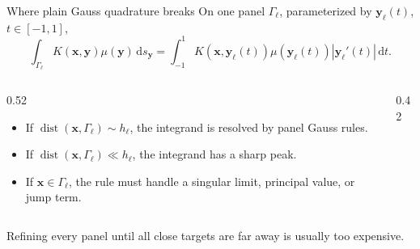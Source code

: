 \documentclass[aspectratio=169,11pt]{beamer}
\newcommand{\dd}{\,\mathrm d}
\newcommand{\x}{\bm{x}}
\newcommand{\y}{\bm{y}}
\DeclareMathOperator{\dist}{dist}
\begin{document}
\begin{frame}{Where plain Gauss quadrature breaks}
\small
On one panel $\Gamma_\ell$, parameterized by $\y_\ell(t)$, $t\in[-1,1]$,
\[
  \int_{\Gamma_\ell} K(\x,\y)\mu(\y)\dd s_{\y}
  =
  \int_{-1}^1 K(\x,\y_\ell(t))\mu(\y_\ell(t))|\y_\ell'(t)|\dd t.
\]

\begin{columns}[T,totalwidth=\textwidth]
\begin{column}{0.52\textwidth}
\begin{itemize}
  \item If $\dist(\x,\Gamma_\ell)\sim h_\ell$, the integrand is resolved by panel Gauss rules.
  \item If $\dist(\x,\Gamma_\ell)\ll h_\ell$, the integrand has a sharp peak.
  \item If $\x\in\Gamma_\ell$, the rule must handle a singular limit, principal value, or jump term.
\end{itemize}
\end{column}
\begin{column}{0.42\textwidth}
\end{column}
\end{columns}

\vspace{1mm}
Refining every panel until all close targets are far away is usually too expensive.
\end{frame}
\end{document}

